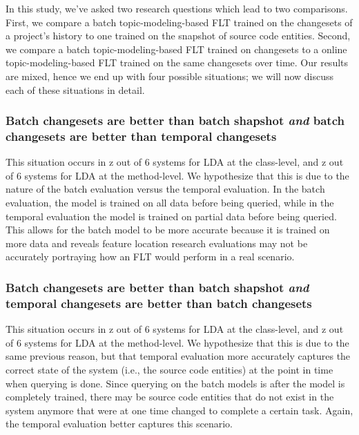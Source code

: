 In this study, we've asked two research questions which lead to two comparisons.
First, we compare a batch topic-modeling-based FLT trained on the changesets
of a project's history to one trained on the snapshot of source code entities.
Second, we compare a batch topic-modeling-based FLT trained on changesets
to a online topic-modeling-based FLT trained on the same changesets over time.
Our results are mixed, hence we end up with four possible situations;
we will now discuss each of these situations in detail.

\subsubsection{Batch changesets are better than batch shapshot
\emph{and} batch changesets are better than temporal changesets}


This situation occurs in
z out of 6 systems for LDA at the class-level, and
z out of 6 systems for LDA at the method-level.
We hypothesize that this is due to the nature of the batch evaluation versus the temporal evaluation.
In the batch evaluation, the model is trained on all data before being queried,
while in the temporal evaluation the model is trained on partial data before being queried.
This allows for the batch model to be more accurate because it is trained on more data
and reveals feature location research evaluations may not be accurately portraying
how an FLT would perform in a real scenario.

\subsubsection{Batch changesets are better than batch shapshot
\emph{and} temporal changesets are better than batch changesets}


This situation occurs in
z out of 6 systems for LDA at the class-level, and
z out of 6 systems for LDA at the method-level.
We hypothesize that this is due to the same previous reason, but that
temporal evaluation more accurately captures the correct state of the system (i.e., the source code entities)
at the point in time when querying is done.
Since querying on the batch models is after the model is completely trained,
there may be source code entities that do not exist in the system anymore
that were at one time changed to complete a certain task.
Again, the temporal evaluation better captures this scenario.

